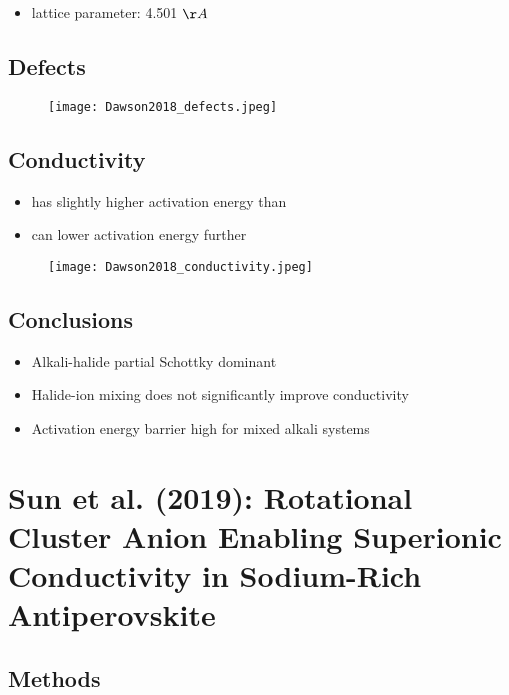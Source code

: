 \documentclass[10pt,a4paper, titlepage]{article}
\begin{document}
\begin{itemize}
  \item {} lattice parameter: 4.501 $\AA$
\end{itemize}

\subsection{Defects}

\begin{figure}[H]
\centering
\texttt{[image: Dawson2018\_defects.jpeg]}
\end{figure}

\subsection{Conductivity}

\begin{itemize}
  \item {} has slightly higher activation energy than 
  \item {} can lower activation energy further
\end{itemize}

\begin{figure}[H]
\centering
\texttt{[image: Dawson2018\_conductivity.jpeg]}
\end{figure}

\subsection{Conclusions}

\begin{itemize}
  \item Alkali-halide partial Schottky dominant
  \item Halide-ion mixing does not significantly improve conductivity
  \item Activation energy barrier high for mixed alkali systems
\end{itemize}

\section{Sun et al. (2019): Rotational Cluster Anion Enabling Superionic Conductivity in
Sodium-Rich Antiperovskite }

\subsection{Methods}
\end{document}
